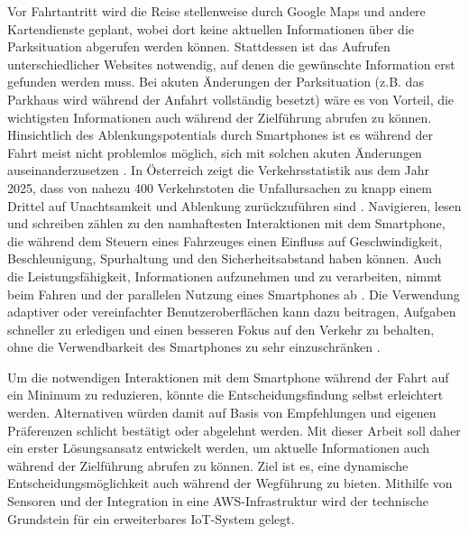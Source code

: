 Vor Fahrtantritt wird die Reise stellenweise durch Google Maps und andere Kartendienste geplant, wobei dort keine aktuellen Informationen über die Parksituation abgerufen werden können. Stattdessen ist das Aufrufen unterschiedlicher Websites notwendig, auf denen die gewünschte Information erst gefunden werden muss. Bei akuten Änderungen der Parksituation (z.B. das Parkhaus wird während der Anfahrt vollständig besetzt) wäre es von Vorteil, die wichtigsten Informationen auch während der Zielführung abrufen zu können. 
Hinsichtlich des Ablenkungspotentials durch Smartphones ist es während der Fahrt meist nicht problemlos möglich, sich mit solchen akuten Änderungen auseinanderzusetzen \parencite[S. 361]{oviedo-trespalaciosUnderstandingImpactsMobile2016}. 
In Österreich zeigt die Verkehrsstatistik aus dem Jahr 2025, dass von nahezu 400 Verkehrstoten die Unfallursachen zu knapp einem Drittel auf Unachtsamkeit und Ablenkung zurückzuführen sind \parencite{bmi397VerkehrstoteAuf2026}. 
Navigieren, lesen und schreiben zählen zu den namhaftesten Interaktionen mit dem Smartphone, die während dem Steuern eines Fahrzeuges einen Einfluss auf Geschwindigkeit, Beschleunigung, Spurhaltung und den Sicherheitsabstand haben können. Auch die Leistungsfähigkeit, Informationen aufzunehmen und zu verarbeiten, nimmt beim Fahren und der parallelen Nutzung eines Smartphones ab \parencite[S. 372-373]{oviedo-trespalaciosUnderstandingImpactsMobile2016}. 
Die Verwendung adaptiver oder vereinfachter Benutzeroberflächen kann dazu beitragen, Aufgaben schneller zu erledigen und einen besseren Fokus auf den Verkehr zu behalten, ohne die Verwendbarkeit des Smartphones zu sehr einzuschränken \parencite[S. 1-3]{khanDesignContextAwareAdaptive2020}. 

Um die notwendigen Interaktionen mit dem Smartphone während der Fahrt auf ein Minimum zu reduzieren, könnte die Entscheidungsfindung selbst erleichtert werden. Alternativen würden damit auf Basis von Empfehlungen und eigenen Präferenzen schlicht bestätigt oder abgelehnt werden. Mit dieser Arbeit soll daher ein erster Lösungsansatz entwickelt werden, um aktuelle Informationen auch während der Zielführung abrufen zu können. Ziel ist es, eine dynamische Entscheidungsmöglichkeit auch während der Wegführung zu bieten. Mithilfe von Sensoren und der Integration in eine \ac{AWS}-Infrastruktur wird der technische Grundstein für ein erweiterbares \ac{IoT}-System gelegt.

	
